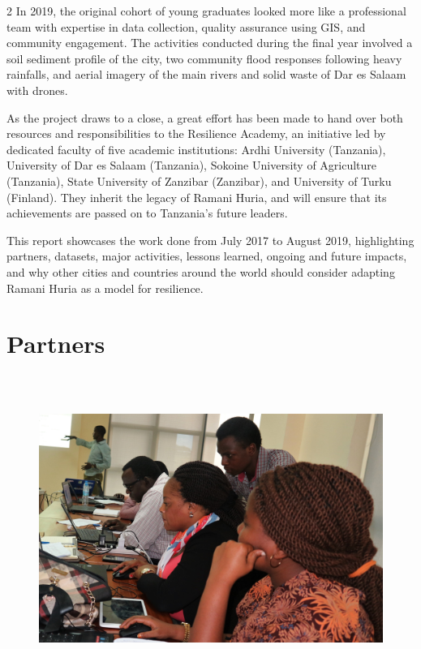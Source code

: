 \documentclass[a4paper,12pt,twoside]{article}
\begin{document}
\begin{multicols} {2}
In 2019, the original cohort of young graduates looked more like a professional team with expertise in data collection, quality assurance using GIS, and community engagement. The activities conducted during the final year involved a soil sediment profile of the city, two community flood responses following heavy rainfalls, and aerial imagery of the main rivers and solid waste of Dar es Salaam with drones. 

As the project draws to a close, a great effort has been made to hand over both resources and responsibilities to the Resilience Academy, an initiative led by dedicated faculty of five academic institutions: Ardhi University (Tanzania), University of Dar es Salaam (Tanzania), Sokoine University of Agriculture (Tanzania), State University of Zanzibar (Zanzibar), and University of Turku (Finland). They inherit the legacy of Ramani Huria, and will ensure that its achievements are passed on to Tanzania’s future leaders. 

This report showcases the work done from July 2017 to August 2019, highlighting partners, datasets, major activities, lessons learned, ongoing and future impacts, and why other cities and countries around the world should consider adapting Ramani Huria as a model for resilience.

\end{multicols}

\newpage
\section{Partners}
\begin{figure}[h!]
	\centering
	\includegraphics[width=\textwidth, height=10cm,keepaspectratio]{images/NBS_training_2.JPG}
\end{figure}
\end{document}
